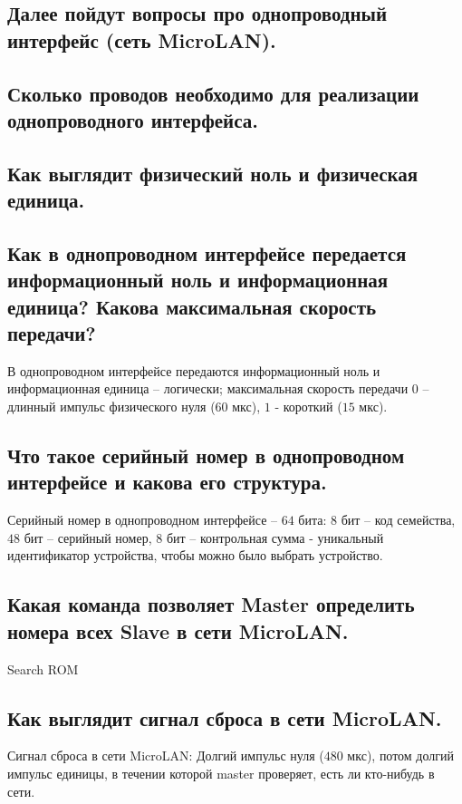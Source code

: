 \subsection{Далее пойдут вопросы про однопроводный интерфейс (сеть MicroLAN).}


\subsection{Сколько проводов необходимо для реализации однопроводного интерфейса.}


\subsection{Как выглядит физический ноль и физическая единица.}


\subsection{Как в однопроводном интерфейсе передается информационный ноль и информационная единица? Какова максимальная скорость  передачи?}

В однопроводном интерфейсе передаются информационный ноль и информационная единица -- 
логически; максимальная скорость  передачи $0$ -- длинный импульс физического нуля ($60$ мкс),
$1$ - короткий ($15$ мкс).

\subsection{Что такое серийный номер в однопроводном интерфейсе и какова его структура.}

Серийный номер в однопроводном интерфейсе -- $64$ бита: $8$ бит -- код семейства, $48$ бит -- 
серийный номер, $8$ бит -- контрольная сумма - уникальный идентификатор устройства, 
чтобы можно было выбрать устройство.

\subsection{Какая команда позволяет Master определить номера всех Slave в сети MicroLAN.}

Search ROM

\subsection{Как выглядит сигнал сброса в сети MicroLAN.}

Сигнал сброса в сети MicroLAN: Долгий импульс нуля ($480$ мкс), потом долгий импульс единицы, 
в течении которой master проверяет, есть ли кто-нибудь в сети.
